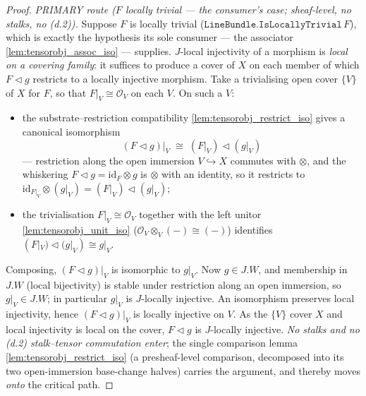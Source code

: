 \begin{proof}

\leanok
  \emph{PRIMARY route (\(F\) locally trivial --- the consumer's case; sheaf-level,
  no stalks, no (d.2)).} Suppose \(F\) is locally trivial
  (\(\mathtt{LineBundle.IsLocallyTrivial}\,F\)), which is exactly the hypothesis its
  sole consumer --- the associator \cref{lem:tensorobj_assoc_iso} --- supplies.
  \(J\)-local injectivity of a morphism is \emph{local on a covering family}: it
  suffices to produce a cover of \(X\) on each member of which \(F \triangleleft g\)
  restricts to a locally injective morphism. Take a trivialising open cover
  \(\{V\}\) of \(X\) for \(F\), so that \(F|_V \cong \mathcal{O}_V\) on each \(V\).
  On such a \(V\):
  \begin{itemize}
    \item the substrate--restriction compatibility \cref{lem:tensorobj_restrict_iso}
      gives a canonical isomorphism
      \[
        (F \triangleleft g)\big|_V \;\cong\; (F|_V) \triangleleft (g|_V)
      \]
      --- restriction along the open immersion \(V \hookrightarrow X\) commutes with
      \(\otimes\), and the whiskering \(F \triangleleft g = \mathrm{id}_F \otimes g\)
      is \(\otimes\) with an identity, so it restricts to \(\mathrm{id}_{F|_V}
      \otimes (g|_V) = (F|_V) \triangleleft (g|_V)\);
    \item the trivialisation \(F|_V \cong \mathcal{O}_V\) together with the left
      unitor \cref{lem:tensorobj_unit_iso} (\(\mathcal{O}_V \otimes_V (-) \cong
      (-)\)) identifies \((F|_V) \triangleleft (g|_V) \cong g|_V\).
  \end{itemize}
  Composing, \((F \triangleleft g)|_V\) is isomorphic to \(g|_V\). Now \(g \in J.W\),
  and membership in \(J.W\) (local bijectivity) is stable under restriction along an
  open immersion, so \(g|_V \in J.W\); in particular \(g|_V\) is \(J\)-locally
  injective. An isomorphism preserves local injectivity, hence \((F \triangleleft
  g)|_V\) is locally injective on \(V\). As the \(\{V\}\) cover \(X\) and local
  injectivity is local on the cover, \(F \triangleleft g\) is \(J\)-locally
  injective. \emph{No stalks and no (d.2) stalk--tensor commutation enter}; the
  single comparison lemma \cref{lem:tensorobj_restrict_iso} (a presheaf-level
  comparison, decomposed into its two open-immersion base-change halves) carries the
  argument, and thereby moves \emph{onto} the critical path.


\end{proof}

